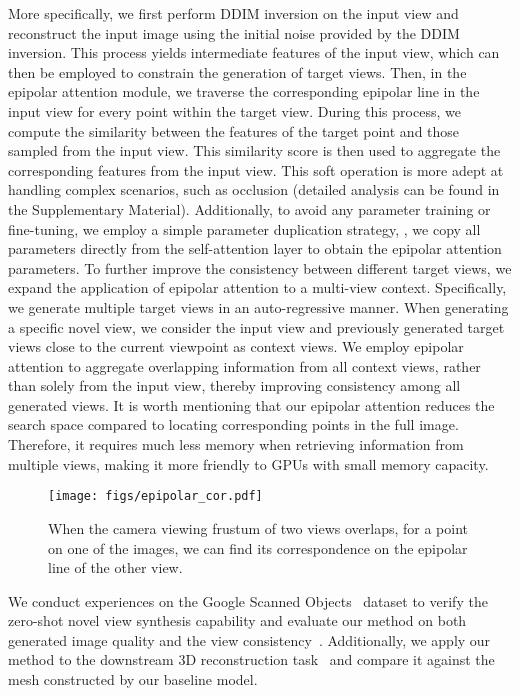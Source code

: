 More specifically, we first perform DDIM inversion on the input view and reconstruct the input image using the initial noise provided by the DDIM inversion.
This process yields intermediate features of the input view, which can then be employed to constrain the generation of target views.
Then, in the epipolar attention module, we traverse the corresponding epipolar line in the input view for every point within the target view. During this process, we compute the similarity between the features of the target point and those sampled from the input view. This similarity score is then used to aggregate the corresponding features from the input view.
This soft operation is more adept at handling complex scenarios, such as occlusion (detailed analysis can be found in the Supplementary Material).
Additionally, to avoid any parameter training or fine-tuning, we employ a simple parameter duplication strategy, \ie, we copy all parameters directly from the self-attention layer to obtain the epipolar attention parameters.
To further improve the consistency between different target views, we expand the application of epipolar attention to a multi-view context.
Specifically, we generate multiple target views in an auto-regressive manner. 
When generating a specific novel view, we consider the input view and previously generated target views close to the current viewpoint as context views.
We employ epipolar attention to aggregate overlapping information from all context views, rather than solely from the input view, thereby improving consistency among all generated views.
It is worth mentioning that our epipolar attention reduces the search space compared to locating corresponding points in the full image. Therefore, it requires much less memory when retrieving information from multiple views, making it more friendly to GPUs with small memory capacity.

\begin{figure}[t]
\vspace{-5mm}
    \centering
    \texttt{[image: figs/epipolar\_cor.pdf]}
     \vspace{-5mm}
    \caption{When the camera viewing frustum of two views overlaps, for a point on one of the images, we can find its correspondence on the epipolar line of the other view.}
    \label{fig:epipolar_vis}
    \vspace{-3mm}
\end{figure}



We conduct experiences on the Google Scanned Objects~\cite{GSO} dataset to verify the zero-shot novel view synthesis capability and evaluate our method on both generated image quality and the view consistency~\cite{3dim}. 
Additionally, we apply our method to the downstream 3D reconstruction task~\cite{neus} and compare it against the mesh constructed by our baseline model.

